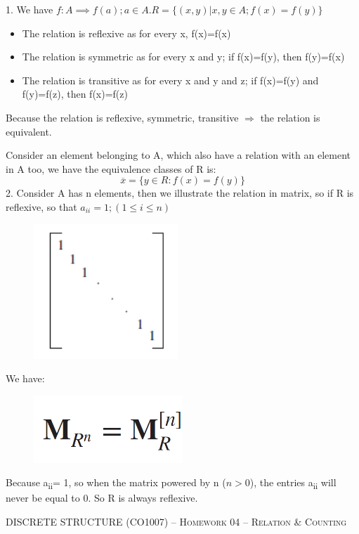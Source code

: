\documentclass[12pt]{amsart}
\begin{document}
1. We have $f: A \implies f(a); a\in A.R=\{(x,y)|x,y \in A; f(x) =f(y)\}$
\begin{itemize}
    \item The relation is reflexive as for every x, f(x)=f(x)
    \item The relation is symmetric as for every x and y; if f(x)=f(y), then f(y)=f(x)
    \item The relation is transitive as for every x and y and z; if f(x)=f(y) and f(y)=f(z), then f(x)=f(z)
\end{itemize}

Because the relation is reflexive, symmetric, transitive $\Rightarrow$ the relation is equivalent.

Consider an element belonging to A, which also have a relation with an element in A too, we have the equivalence classes of R is:
\[\overline{x}=\{y\in R: f(x) = f(y)\}\]
2. Consider A has n elements, then we illustrate the relation in matrix, so if R is reflexive, so that $a_{ii} = 1; (1 \leq i \leq n)$
\begin{figure}[h]
		\includegraphics[width=2.in,height=2in]{problem_2_2_1.png}
\end{figure}

We have: \par
\begin{figure}[h]
		\includegraphics[width=2.in,height=1in]{problem_2_2_2.png}
\end{figure}

 Because a\textsubscript{ii}= 1, so when the matrix powered by n ($n>0$), the entries a\textsubscript{ii }will never be equal to 0. So R is always reflexive.
\newpage

{\scshape } \hfill {\scshape DISCRETE STRUCTURE (CO1007) -- Homework 04 -- Relation \& Counting} \hfill {\scshape }
 
\end{document}
